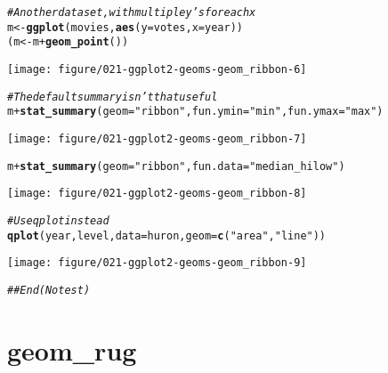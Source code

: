 \documentclass[a4paper,titlepage]{tufte-handout}\usepackage[]{graphicx}\usepackage[]{color}
\makeatletter
\def\maxwidth{ %
  \ifdim\Gin@nat@width>\linewidth
    \linewidth
  \else
    \Gin@nat@width
  \fi
}
\newcommand{\hlstr}[1]{\textcolor[rgb]{0.192,0.494,0.8}{#1}}%
\newcommand{\hlcom}[1]{\textcolor[rgb]{0.678,0.584,0.686}{\textit{#1}}}%
\newcommand{\hlopt}[1]{\textcolor[rgb]{0,0,0}{#1}}%
\newcommand{\hlstd}[1]{\textcolor[rgb]{0.345,0.345,0.345}{#1}}%
\newcommand{\hlkwb}[1]{\textcolor[rgb]{0.69,0.353,0.396}{#1}}%
\newcommand{\hlkwc}[1]{\textcolor[rgb]{0.333,0.667,0.333}{#1}}%
\newcommand{\hlkwd}[1]{\textcolor[rgb]{0.737,0.353,0.396}{\textbf{#1}}}%
\newenvironment{kframe}{%
 \def\at@end@of@kframe{}%
 \ifinner\ifhmode%
  \def\at@end@of@kframe{\end{minipage}}%
  \begin{minipage}{\columnwidth}%
 \fi\fi%
 \def\FrameCommand##1{\hskip\@totalleftmargin \hskip-\fboxsep
 \colorbox{shadecolor}{##1}\hskip-\fboxsep
     \hskip-\linewidth \hskip-\@totalleftmargin \hskip\columnwidth}%
 \MakeFramed {\advance\hsize-\width
   \@totalleftmargin\z@ \linewidth\hsize
   \@setminipage}}%
 {\par\unskip\endMakeFramed%
 \at@end@of@kframe}
\newenvironment{knitrout}{}{} %
\makeatother
\begin{document}
\begin{knitrout}
\begin{kframe}\begin{alltt}
\hlcom{# Another data set, with multiple y's for each x}
\hlstd{m} \hlkwb{<-} \hlkwd{ggplot}\hlstd{(movies,} \hlkwd{aes}\hlstd{(}\hlkwc{y}\hlstd{=votes,} \hlkwc{x}\hlstd{=year))}
\hlstd{(m} \hlkwb{<-} \hlstd{m} \hlopt{+} \hlkwd{geom_point}\hlstd{())}
\end{alltt}
\end{kframe}
\texttt{[image: figure/021-ggplot2-geoms-geom\_ribbon-6]} 
\begin{kframe}\begin{alltt}
\hlcom{# The default summary isn't that useful}
\hlstd{m} \hlopt{+} \hlkwd{stat_summary}\hlstd{(}\hlkwc{geom}\hlstd{=}\hlstr{"ribbon"}\hlstd{,} \hlkwc{fun.ymin}\hlstd{=}\hlstr{"min"}\hlstd{,} \hlkwc{fun.ymax}\hlstd{=}\hlstr{"max"}\hlstd{)}
\end{alltt}
\end{kframe}
\texttt{[image: figure/021-ggplot2-geoms-geom\_ribbon-7]} 
\begin{kframe}\begin{alltt}
\hlstd{m} \hlopt{+} \hlkwd{stat_summary}\hlstd{(}\hlkwc{geom}\hlstd{=}\hlstr{"ribbon"}\hlstd{,} \hlkwc{fun.data}\hlstd{=}\hlstr{"median_hilow"}\hlstd{)}
\end{alltt}
\end{kframe}
\texttt{[image: figure/021-ggplot2-geoms-geom\_ribbon-8]} 
\begin{kframe}\begin{alltt}
\hlcom{# Use qplot instead}
\hlkwd{qplot}\hlstd{(year, level,} \hlkwc{data}\hlstd{=huron,} \hlkwc{geom}\hlstd{=}\hlkwd{c}\hlstd{(}\hlstr{"area"}\hlstd{,} \hlstr{"line"}\hlstd{))}
\end{alltt}


{\ttfamily\noindent\color{warningcolor}{\#\# Warning in loop\_apply(n, do.ply): Removed 9 rows containing missing values (position\_stack).}}\end{kframe}
\texttt{[image: figure/021-ggplot2-geoms-geom\_ribbon-9]} 
\begin{kframe}\begin{alltt}
\hlcom{## End(No test)}
\end{alltt}
\end{kframe}
\end{knitrout}


\section{geom\_rug}
\end{document}
